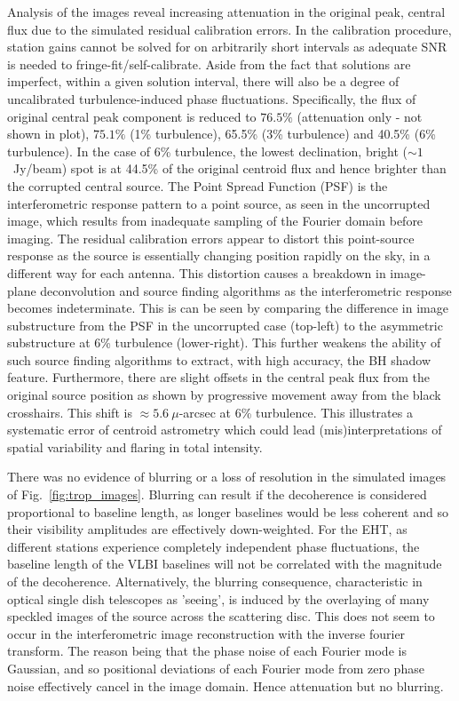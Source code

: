 Analysis of the images reveal increasing attenuation in the original peak, central flux due to the simulated residual calibration errors. In the calibration procedure, station gains cannot be solved for on arbitrarily short intervals as adequate SNR is needed to fringe-fit/self-calibrate. Aside from the fact that solutions are imperfect, within a given solution interval, there will also be a degree of uncalibrated turbulence-induced phase fluctuations. Specifically, the flux of original central peak component is reduced to $76.5\%$ (attenuation only - not shown in plot), $75.1\%$ (1\% turbulence), 65.5\% (3\% turbulence) and  40.5\% (6\% turbulence). In the case of 6\% turbulence, the lowest declination, bright ($\sim 1$~Jy/beam) spot is at 44.5\% of the original centroid flux and hence brighter than the corrupted central source. 
The Point Spread Function (PSF) is the interferometric response pattern to a point source, as seen in the uncorrupted image, which results from inadequate sampling of the Fourier domain before imaging. The residual calibration errors appear to distort this point-source response as the source is essentially changing position rapidly on the sky, in a different way for each antenna. This distortion causes a breakdown in image-plane deconvolution and source finding algorithms as the interferometric response becomes indeterminate. This is can be seen by comparing the difference in image substructure from the PSF in the uncorrupted case (top-left) to the asymmetric substructure at 6\% turbulence (lower-right). This further weakens the ability of such source finding algorithms to extract, with high accuracy, the BH shadow feature.
Furthermore, there are slight offsets in the central peak flux from the original source position as shown by progressive movement away from the black crosshairs. This shift is $\approx 5.6\ \mu$-arcsec at 6\% turbulence. This illustrates a systematic error of centroid astrometry which could lead (mis)interpretations of spatial variability and flaring in total intensity.


There was no evidence of blurring or a loss of resolution in the simulated images of Fig.~\ref{fig:trop_images}. Blurring can result if the decoherence is considered proportional to baseline length, as longer baselines would be less coherent and so their visibility amplitudes are effectively down-weighted. For the EHT, as different stations experience completely independent phase fluctuations, the baseline length of the VLBI baselines will not be correlated with the magnitude of the decoherence. Alternatively, the blurring consequence, characteristic in optical single dish telescopes as 'seeing', is induced by the overlaying of many speckled images of the source \citep{Narayan_1992} across the scattering disc. This does not seem to occur in the interferometric image reconstruction with the inverse fourier transform. The reason being that the phase noise of each Fourier mode is Gaussian, and so positional deviations of each Fourier mode from zero phase noise effectively cancel in the image domain. Hence attenuation but no blurring.


